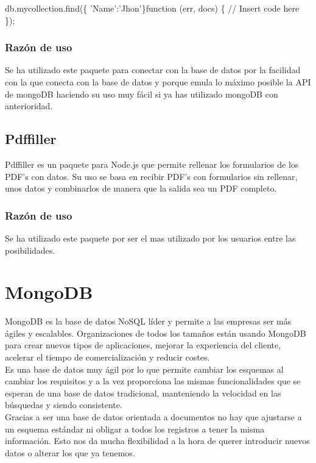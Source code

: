 \begin{codigo}
	  db.mycollection.find(\{ 'Name':'Jhon'\}function (err, docs) \{
	  	// Insert code here 
	  \});
\end{codigo}

\subsubsection{Razón de uso}
Se ha utilizado este paquete para conectar con la base de datos por la facilidad con la que conecta con la base de datos y porque emula lo máximo posible la API de mongoDB haciendo su uso muy fácil si ya has utilizado mongoDB con anterioridad.

\subsection{Pdffiller}
Pdffiller es un paquete para Node.js que permite rellenar los formularios de los PDF’s con datos. Su uso se basa en recibir PDF’s con formularios sin rellenar, unos datos y combinarlos de manera que la salida sea un PDF completo. 

\subsubsection{Razón de uso}
Se ha utilizado este paquete por ser el mas utilizado por los usuarios entre las posibilidades. 

\section{MongoDB}
MongoDB es la base de datos NoSQL líder y permite a las empresas ser más ágiles y escalables. Organizaciones de todos los tamaños están usando MongoDB para crear nuevos tipos de aplicaciones, mejorar la experiencia del cliente, acelerar el tiempo de comercialización y reducir costes.\\

Es una base de datos muy ágil por lo que permite cambiar los esquemas al cambiar los requisitos y a la vez proporciona las mismas funcionalidades que se esperan de una base de datos tradicional, manteniendo la velocidad en las búsquedas y siendo consistente.\\

Gracias a ser una base de datos orientada a documentos no hay que ajustarse a un esquema estándar ni obligar a todos los registros a tener la misma información. Esto nos da mucha flexibilidad a la hora de querer introducir nuevos datos o alterar los que ya tenemos.\\

